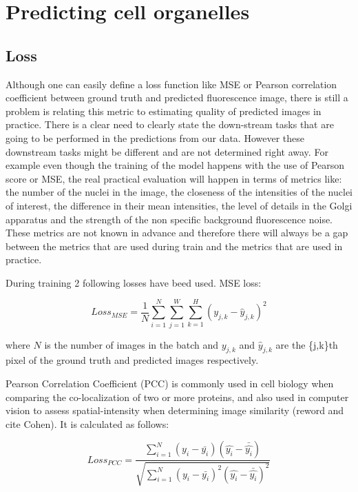 \section{Predicting cell organelles}
\subsection{Loss}
Although one can easily define a loss function like MSE or Pearson correlation coefficient between ground truth and predicted fluorescence image, there is still a problem is relating this metric to estimating quality of predicted images in practice. There is a clear need to clearly state the down-stream tasks that are going to be performed in the predictions from our data. However these downstream tasks might be different and are not determined right away. For example even though the training of the model happens with the use of Pearson score or MSE, the real practical evaluation will happen in terms of metrics like: the number of the nuclei in the image, the closeness of the intensities of the nuclei of interest, the difference in their mean intensities, the level of details in the Golgi apparatus and the strength of the non specific background fluorescence noise. These metrics are not known in advance and therefore there will always be a gap between the metrics that are used during train and the metrics that are used in practice.

During training 2 following losses have beed used. MSE loss:

\begin{equation}
    Loss_{MSE} = \frac{1}{N} \sum_{i=1}^{N}{\sum_{j=1}^{W}{\sum_{k=1}^{H}{(y_{j,k} - \hat{y}_{j,k})^2}}}
\end{equation}

where $N$ is the number of images in the batch and $y_{j,k}$ and $\hat{y}_{j,k}$ are the \{j,k\}th pixel of the ground truth and predicted images respectively.

Pearson Correlation Coefficient (PCC) is commonly used in cell biology when comparing the co-localization of two or more proteins, and also used in computer vision to assess spatial-intensity when determining image similarity (reword and cite Cohen). It is calculated as follows:

\begin{equation}
    Loss_{PCC} = \frac{\sum_{i=1}^{N}{(y_i - \bar{y_i})(\hat{y_i} - \bar{\hat{y_i}})}}{\sqrt{\sum_{i=1}^{N}{(y_i - \bar{y_i})^2(\hat{y_i} - \bar{\hat{y_i}})^2}}}
\end{equation}

